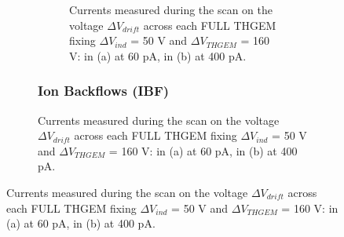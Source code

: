\documentclass[a4paper, 11 pt]{article}
\newcommand{\Vind}{$\Delta V_{ind}$}
\newcommand{\Vthgem}{$\Delta V_{THGEM}$}
\newcommand{\Vdrift}{$ \Delta V_{drift}$}
\begin{document}
\begin{figure}[htbp]
\begin{figure}[htbp]
\begin{figure}[!htb]
	\centering
	\caption{Currents measured during the scan on the voltage \Vdrift{} across each FULL THGEM fixing \Vind{} = 50 V and \Vthgem{} = 160 V: in (a) at 60 pA, in (b) at 400 pA.}
	\label{fig:driftScan_THGEM10_beam_10mbar}
\end{figure}

\subsubsection{Ion Backflows (IBF)}


\end{figure}
\end{figure}
\end{document}
